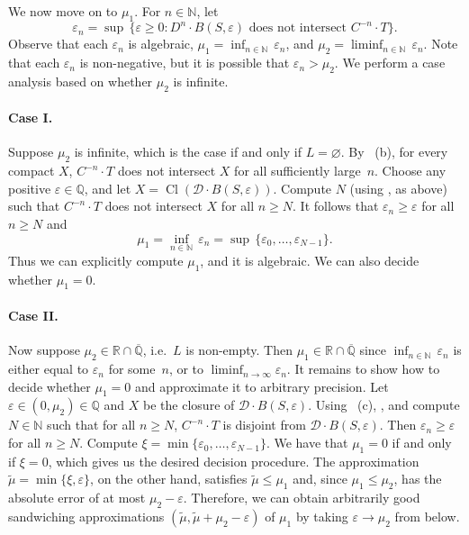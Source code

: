 \documentclass[a4paper,UKenglish,cleveref]{lipics-v2021}
\newcommand{\nat}{\mathbb{N}}
\newcommand{\rel}{\mathbb{R}}
\newcommand{\rat}{\mathbb{Q}}
\newcommand{\alg}{\overline{\rat}}
\newcommand{\ralg}{\rel \cap \alg}
\newcommand{\Dcal}{\mathcal{D}}
\begin{document}
We now move on to $\mu_1$.
For $n\in\nat$, let 
\[
\varepsilon_n = \sup\, \{\varepsilon \ge 0 \colon D^n \cdot B(S,\varepsilon) \textrm{ does not intersect }C^{-n} \cdot T\}.
\]
Observe that each $\varepsilon_n$ is algebraic, $\mu_1 = \inf_{n \in \nat}\, \varepsilon_n$, and $\mu_2 = \liminf_{n \in \nat}\, \varepsilon_n$.
Note that each $\varepsilon_n$ is non-negative, but it is possible that $\varepsilon_n > \mu_2$.
We perform a case analysis based on whether $\mu_2$ is infinite.

\paragraph*{Case I.} Suppose $\mu_2$ is infinite, which is the case if and only if $L = \varnothing$.
By ~(b), for every compact $X$, $C^{-n} \cdot T$ does not intersect $X$ for all sufficiently large~$n$.
Choose any positive $\varepsilon \in \rat$, and let $X = \operatorname{Cl}(\Dcal \cdot B(S,\varepsilon))$.
Compute $N$ (using , as above) such that $C^{-n} \cdot T$ does not intersect $X$ for all $n \ge  N$.
It follows that $\varepsilon_n \ge \varepsilon$ for all $n \ge N$ and 
\[
\mu_1 = \inf_{n\in\nat} \, \varepsilon_n = \sup \, \{\varepsilon_0, \ldots, \varepsilon_{N-1}\}.
\]
Thus we can explicitly compute $\mu_1$, and it is algebraic.
We can also decide whether $\mu_1 = 0$.

\paragraph*{Case II.} 
Now suppose $\mu_2 \in \ralg$, i.e.\ $L$ is non-empty. 
Then $\mu_1 \in \ralg$ since $\inf_{n\in\nat}\, \varepsilon_n$ is either equal to $\varepsilon_n$ for some~$n$, or to $\liminf_{n\to \infty} \varepsilon_n$.
It remains to show how to decide whether $\mu_1= 0$ and approximate it to arbitrary precision.
Let $\varepsilon \in (0, \mu_2) \in \rat$ and $X$ be the closure of $\Dcal \cdot B(S,\varepsilon)$.
Using ~(c), , and  compute $N \in \nat$ such that for all $n \ge N$, $C^{-n}\cdot T $ is disjoint from $\Dcal \cdot B(S,\varepsilon)$.
Then $\varepsilon_n \ge \varepsilon$ for all $n \ge N$.
Compute $\xi = \min \{\varepsilon_0, \ldots, \varepsilon_{N-1}\}$.
We have that $\mu_1 = 0$ if and only if $\xi = 0$, which gives us the desired decision procedure.
The approximation $\widetilde{\mu} = \min \{\xi, \varepsilon\}$, on the other hand, satisfies $\widetilde{\mu} \le \mu_1$ and, since $\mu_1 \le \mu_2$, has the absolute error of at most $\mu_2 - \varepsilon$.
Therefore, we can obtain arbitrarily good sandwiching approximations $(\widetilde{\mu}, \widetilde{\mu} + \mu_2-\varepsilon)$ of $\mu_1$ by taking $\varepsilon \to \mu_2$ from below. 
\end{document}
